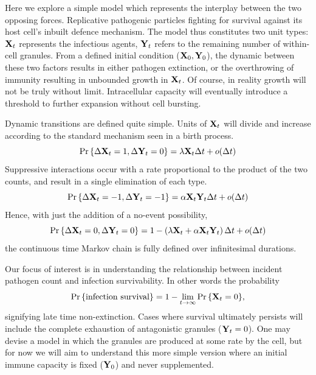 Here we explore a simple model which represents the interplay between the two opposing forces. Replicative pathogenic particles fighting for survival against its host cell's inbuilt defence mechanism. The model thus constitutes two unit types: ${{\bf X}_t}$ represents the infectious agents, ${{\bf Y}_t}$ refers to the remaining number of within-cell granules. From a defined initial condition (${\bf X}_0, {\bf Y}_0$), the dynamic between these two factors results in either pathogen extinction, or the overthrowing of immunity resulting in unbounded growth in ${{\bf X}_t}$. Of course, in reality growth will not be truly without limit. Intracellular capacity will eventually introduce a threshold to further expansion without cell bursting.\par
Dynamic transitions are defined quite simple. Units of ${{\bf X}_t}$ will divide and increase according to the standard mechanism seen in a birth process. 
$${\text{Pr}\left\{\Delta {{\bf X}_t} = 1, \Delta {{\bf Y}_t} = 0\right\}} = \lambda {{\bf X}_t} \Delta t + o(\Delta t) $$
Suppressive interactions occur with a rate proportional to the product of the two counts, and result in a single elimination of each type.  
 $${\text{Pr}\left\{\Delta {{\bf X}_t} = -1, \Delta {{\bf Y}_t} = -1\right\}} = \alpha {{\bf X}_t} {{\bf Y}_t}  \Delta t + o(\Delta t) $$
 Hence, with just the addition of a no-event possibility, 
 $${\text{Pr}\left\{\Delta {{\bf X}_t} = 0, \Delta {{\bf Y}_t} = 0\right\}} = 1 -  \left( \lambda{{\bf X}_t}   + \alpha {{\bf X}_t} {{\bf Y}_t} \right) \Delta t + o(\Delta t) $$
 the continuous time Markov chain is fully defined over infinitesimal durations.


Our focus of interest is in understanding the relationship between incident pathogen count and infection survivability. In other words the probability 
$${\text{Pr}\left\{\text{infection survival}\right\}} =  1 - \lim_{t\to\infty} {\text{Pr}\left\{{{\bf X}_t} = 0\right\}},$$
signifying late time non-extinction. Cases where survival ultimately persists will include the complete exhaustion of antagonistic granules (${{\bf Y}_t} = 0$). One may devise a model in which the granules are produced at some rate by the cell, but for now we will aim to understand this more simple version where an initial immune capacity is fixed (${\bf Y}_0$) and never supplemented.  

























